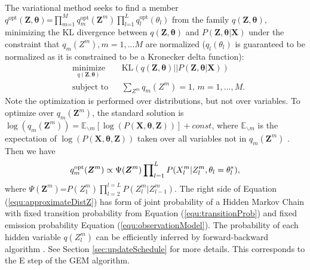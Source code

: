 The variational method seeks to find a member $q^{\text{opt}}(\bm{Z},\bm{\theta}) \text{=} \prod_{m\text{=}1}^M{q_m^{\text{opt}}(\bm{Z}^m)}\prod_{l\text{=}1}^{L}{q_l^{\text{opt}}(\theta_l)}$ from the family  $q(\bm{Z},\bm{\theta})$,  minimizing the KL divergence between $q(\bm{Z},\bm{\theta})$ and $P(\bm{Z}, \bm{\theta}|\bm{X})$ under the constraint that $q_m(Z^m), m=1,...M$ are normalized ($q_l(\theta_l)$ is guaranteed to be normalized as it is constrained to be a Kronecker delta function):
\begin{equation}
\begin{aligned}
& \underset{q(\bm{Z}, \bm{\theta})}{\text{minimize}}
& & \text{KL}(q(\bm{Z}, \bm{\theta})||P(\bm{Z},\bm{\theta}|\bm{X})) \\
& \text{subject to}
& & \sum\nolimits_{Z^m}{q_m(Z^m)=1} \text{, } m = 1, \ldots, M.
\end{aligned}
\label{equ:KLobjective}
\end{equation}
Note the optimization is performed over distributions, but not over variables.
To optimize over $q_m(\bm{Z}^m)$, the standard solution \cite{BishopBook} is $\log{(q_m(\bm{Z}^m))} = \mathbb{E}_{\backslash m}[\log{(P(\bm{X},\bm{\theta},\bm{Z}))}]+const$, where $\mathbb{E}_{\backslash m}$ is the  expectation of $\log{(P(\bm{X},\bm{\theta},\bm{Z}))}$ taken over all variables not in $q_m(\bm{Z}^m)$ \cite{BishopBook}. Then we have
\begin{equation}
{q_m^{\text{opt}}(\bm{Z}^m)}\\
\propto{\Psi(\bm{Z}^m)
\prod\nolimits_{l=1}^{L}{P(X_l^m|Z_l^m,\theta_l=\theta_l^*})},
\label{equ:approximateDistZ}
\end{equation}
where $\Psi(\bm{Z}^m) \text{=} P(Z_1^m)\prod_{l=2}^{l=L}P(Z_l^m|Z_{l-1}^m)$.
The right side of Equation (\ref{equ:approximateDistZ}) has form of joint probability of a Hidden Markov Chain with fixed transition probability from Equation (\ref{equ:transitionProb}) and fixed emission probability Equation (\ref{equ:observationModel}). The probability of each hidden variable $q(Z_l^m)$ can be efficiently inferred by forward-backward algorithm \cite{BishopBook}. %
See Section \ref{sec:updateSchedule} for more details. This corresponds to the E step of the GEM algorithm.

